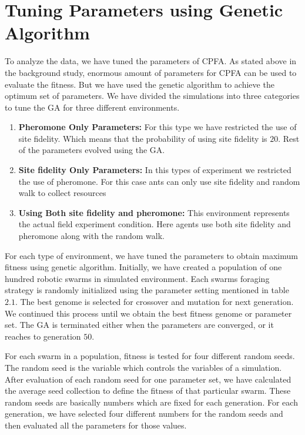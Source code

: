 \section{\label{section:Tuning Parameters using Genetic Algorithm}Tuning Parameters using Genetic Algorithm}
   To analyze the data, we have tuned the parameters of CPFA. As stated above in the background study, enormous amount of parameters for CPFA can be used to evaluate the fitness. But we have used the genetic algorithm to achieve the optimum set of parameters. We have divided the simulations into three categories to tune the GA for three different environments. 
   \begin{enumerate}
   	\item \textbf{Pheromone Only Parameters:}  For this type we have restricted the use of site fidelity. Which means that the probability of using site fidelity is $20$. Rest of the parameters evolved using the GA. 
   	\item \textbf{Site fidelity Only Parameters:} In this types of experiment we restricted the use of pheromone. For this case ants can only use site fidelity and random walk to collect resources
   	\item \textbf{Using Both site fidelity and pheromone:} This environment represents the actual field experiment condition. Here agents use both site fidelity and pheromone along with the random walk.    	
   \end{enumerate}
For each type of environment, we have tuned the parameters to obtain maximum fitness using genetic algorithm. Initially, we have created a population of one hundred robotic swarms in simulated environment. Each swarm\textquotesingle s foraging strategy is randomly initialized using the parameter setting mentioned in table $2.1$. The best genome is selected for crossover and mutation for next generation. We continued this process until we obtain the best fitness genome or parameter set. The GA is terminated either when the parameters are converged, or it reaches to generation $50$.\par  
For each swarm in a population, fitness is tested for four different random seeds. The random seed is the variable which controls the variables of a simulation. After evaluation of each random seed for one parameter set, we have calculated the average seed collection to define the fitness of that particular swarm. These random seeds are basically numbers which are fixed for each generation. For each generation, we have selected four different numbers for the random seeds and then evaluated all the parameters for those values.\par 
